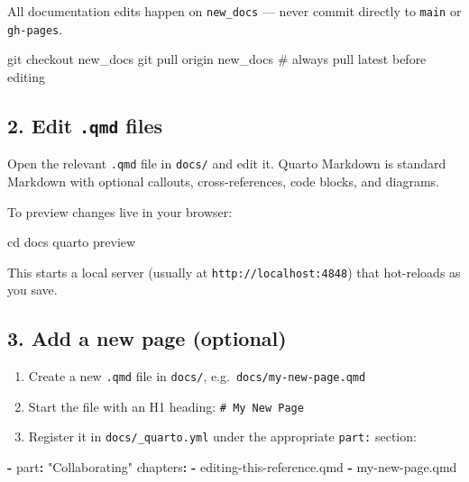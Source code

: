 \documentclass[
  letterpaper,
  DIV=11,
  numbers=noendperiod]{scrreprt}
\newenvironment{Shaded}{\begin{snugshade}}{\end{snugshade}}
\newcommand{\AttributeTok}[1]{\textcolor[rgb]{0.40,0.45,0.13}{#1}}
\newcommand{\BuiltInTok}[1]{\textcolor[rgb]{0.00,0.23,0.31}{#1}}
\newcommand{\CommentTok}[1]{\textcolor[rgb]{0.37,0.37,0.37}{#1}}
\newcommand{\ExtensionTok}[1]{\textcolor[rgb]{0.00,0.23,0.31}{#1}}
\newcommand{\FunctionTok}[1]{\textcolor[rgb]{0.28,0.35,0.67}{#1}}
\newcommand{\KeywordTok}[1]{\textcolor[rgb]{0.00,0.23,0.31}{\textbf{#1}}}
\newcommand{\NormalTok}[1]{\textcolor[rgb]{0.00,0.23,0.31}{#1}}
\newcommand{\StringTok}[1]{\textcolor[rgb]{0.13,0.47,0.30}{#1}}
\providecommand{\tightlist}{%
  \setlength{\itemsep}{0pt}\setlength{\parskip}{0pt}}
\begin{document}
All documentation edits happen on \texttt{new\_docs} --- never commit
directly to \texttt{main} or \texttt{gh-pages}.

\begin{Shaded}
\begin{Highlighting}[]
\FunctionTok{git}\NormalTok{ checkout new\_docs}
\FunctionTok{git}\NormalTok{ pull origin new\_docs      }\CommentTok{\# always pull latest before editing}
\end{Highlighting}
\end{Shaded}

\subsection{\texorpdfstring{2. Edit \texttt{.qmd}
files}{2. Edit .qmd files}}\label{edit-.qmd-files}

Open the relevant \texttt{.qmd} file in \texttt{docs/} and edit it.
Quarto Markdown is standard Markdown with optional callouts,
cross-references, code blocks, and diagrams.

To preview changes live in your browser:

\begin{Shaded}
\begin{Highlighting}[]
\BuiltInTok{cd}\NormalTok{ docs}
\ExtensionTok{quarto}\NormalTok{ preview}
\end{Highlighting}
\end{Shaded}

This starts a local server (usually at \texttt{http://localhost:4848})
that hot-reloads as you save.

\subsection{3. Add a new page (optional)}\label{add-a-new-page-optional}

\begin{enumerate}
\def\labelenumi{\arabic{enumi}.}
\tightlist
\item
  Create a new \texttt{.qmd} file in \texttt{docs/},
  e.g.~\texttt{docs/my-new-page.qmd}
\item
  Start the file with an H1 heading: \texttt{\#\ My\ New\ Page}
\item
  Register it in \texttt{docs/\_quarto.yml} under the appropriate
  \texttt{part:} section:
\end{enumerate}

\begin{Shaded}
\begin{Highlighting}[]
\KeywordTok{{-}}\AttributeTok{ }\FunctionTok{part}\KeywordTok{:}\AttributeTok{ }\StringTok{"Collaborating"}
\AttributeTok{  }\FunctionTok{chapters}\KeywordTok{:}
\AttributeTok{    }\KeywordTok{{-}}\AttributeTok{ editing{-}this{-}reference.qmd}
\AttributeTok{    }\KeywordTok{{-}}\AttributeTok{ my{-}new{-}page.qmd}
\end{Highlighting}
\end{Shaded}
\end{document}
